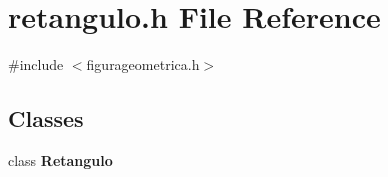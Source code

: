 \section{retangulo.\+h File Reference}
\label{retangulo_8h}
{\ttfamily \#include $<$figurageometrica.\+h$>$}\newline
\subsection*{Classes}
\begin{DoxyCompactItemize}
\item 
class \textbf{ Retangulo}
\end{DoxyCompactItemize}
